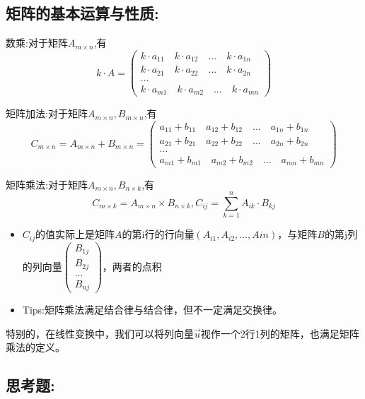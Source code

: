 \documentclass[UTF8]{article}
\begin{document}
\subsection{矩阵的基本运算与性质:}

数乘:对于矩阵$A_{m\times n}$,有
$$k\cdot A = 
\left(
\begin{array}{l}
k\cdot a_{11} \quad k\cdot a_{12} \quad ... \quad k\cdot a_{1n} \\ 
k\cdot a_{21} \quad k\cdot a_{22} \quad ... \quad k\cdot a_{2n} \\
... \\
k\cdot a_{m1} \quad k\cdot a_{m2} \quad ... \quad k\cdot a_{mn}
\end{array}
\right)$$

矩阵加法:对于矩阵$A_{m\times n}, B_{m\times n}$,有
$$C_{m\times n} = A_{m\times n} + B_{m\times n} = 
\left(
\begin{array}{l}
a_{11} + b_{11} \quad a_{12} + b_{12} \quad ... \quad a_{1n} + b_{1n} \\ 
a_{21} + b_{21} \quad a_{22} + b_{22} \quad ... \quad a_{2n} + b_{2n} \\
... \\
a_{m1} + b_{m1} \quad a_{m2} + b_{m2} \quad ... \quad a_{mn} + b_{mn}
\end{array}
\right)$$

矩阵乘法:对于矩阵$A_{m\times n}, B_{n\times k}$,有
$$C_{m\times k} = A_{m\times n} \times B_{n\times k},C_{ij} = \sum_{k = 1}^{n}{A_{ik}\cdot B_{kj}}$$

\begin{itemize}
	\item $C_{ij}$的值实际上是矩阵$A$的第i行的行向量$(A_{i1}, A_{i2}, ..., A{in})$，与矩阵$B$的第j列的列向量$\left(
\begin{array}{l}
B_{1j} \\ 
B_{2j} \\
... \\
B_{nj}
\end{array}
\right)$，两者的点积
	\item Tips:矩阵乘法满足结合律与结合律，但不一定满足交换律。
\end{itemize}

特别的，在线性变换中，我们可以将列向量$\vec{u}$视作一个2行1列的矩阵，也满足矩阵乘法的定义。

\subsection{思考题:}
\end{document}
